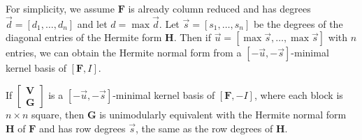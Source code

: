 For simplicity, we assume $\mathbf{F}$ is already column reduced
and has degrees $\vec{d}=\left[d_{1},\dots,d_{n}\right]$ and let
$d=\max\vec{d}$. Let $\vec{s}=\left[s_{1},\dots,s_{n}\right]$ be
the degrees of the diagonal entries of the Hermite form $\mathbf{H}$.
Then if $\vec{u}=\left[\max\vec{s},\dots,\max\vec{s}\right]$ with
$n$ entries, we can obtain the Hermite normal form from a $\left[-\vec{u},-\vec{s}\right]$-minimal
kernel basis of $\left[\mathbf{F},I\right]$.
\begin{lem}
If $\begin{bmatrix}\mathbf{V}\\
\mathbf{G}
\end{bmatrix}$ is a $\left[-\vec{u},-\vec{s}\right]$-minimal kernel basis of $\left[\mathbf{F},-I\right]$,
where each block is $n\times n$ square, then $\mathbf{G}$ is unimodularly
equivalent with the Hermite normal form $\mathbf{H}$ of $\mathbf{F}$
and has row degrees $\vec{s}$, the same as the row degrees of $\mathbf{H}$.\end{lem}
